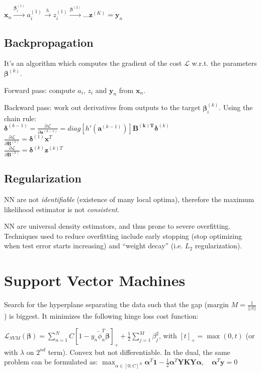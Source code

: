 \documentclass[10pt,a4paper,landscape]{article}
\renewcommand{\bf}[1]{\ensuremath{\mathbf{#1}}}
\newcommand{\balpha}{\boldsymbol\alpha}
\newcommand{\bbeta}{\boldsymbol\beta}
\newcommand{\bdelta}{\boldsymbol\delta}
\begin{document}
\begin{multicols*}{4}
$\bf{x}_n \xrightarrow{\bbeta_i^{(1)}} a_i^{(1)} \xrightarrow{h} z_i^{(1)} \xrightarrow{\bbeta^{(2)}} \dots \bf{z}^{(K)} = \bf{y}_n$

\subsection{Backpropagation}
It's an algorithm which computes the gradient of the cost $\mathcal{L}$ w.r.t. the parameters $\bbeta^{(k)}$.

Forward pass: compute $a_i$, $z_i$ and $\bf{y}_n$ from $\bf{x}_n$.

Backward pass: work out derivatives from outputs to the target $\bbeta_i^{(k)}$. Using the chain rule:\\
$\bdelta^{(k-1)} = \frac{\partial \mathcal{L}}{\partial \bf{a}^{(k-1)}} = diag[ h'(\bf{a}^{(k-1)}) ] \bf{B^{(k)T}} \bdelta^{(k)}$\\
$\frac{\partial \mathcal{L}}{\partial \bf{B}^{(1)}} = \bdelta^{(1)} \bf{x}^T$\\
$\frac{\partial \mathcal{L}}{\partial \bf{B}^{(k)}} = \bdelta^{(k)} \bf{z}^{(k)T}$

\subsection{Regularization}
NN are not \textit{identifiable} (existence of many local optima), therefore the maximum likelihood estimator is not \textit{consistent}.

NN are universal density estimators, and thus prone to severe overfitting. Techniques used to reduce overfitting include early stopping (stop optimizing when test error starts increasing) and ``weight decay'' (i.e. $L_2$ regularization).

\section{Support Vector Machines}
Search for the hyperplane separating the data such that the gap (margin $M = \frac{1}{||\beta||}$) is biggest.
It minimizes the following hinge loss cost function:

$\mathcal{L}_{SVM} (\bbeta)= \sum_{n=1}^N C[1 - y_n \tilde\phi_n^T \bbeta]_{+} + \frac{1}{2} \sum_{j=1}^M \beta_j^2$, with $[t]_{+} = \max(0, t)$ (or with $\lambda$ on $2^{nd}$ term). 
Convex but not differentiable. In the dual, the same problem can be formulated as:
$\max_{\alpha \in [0; C]^N} \balpha^T \bf{1} - \frac{1}{2} \balpha^T \bf{Y K Y} \balpha , \quad \balpha^T \bf{y} = 0$


\end{multicols*}
\end{document}
